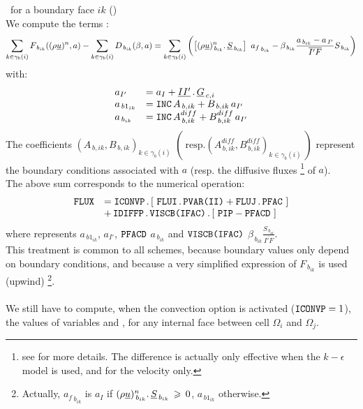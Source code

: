 \hspace*{1cm}{\tiny$\blacksquare$}\, for a boundary face $ik$ ()\\
We compute the terms :
\begin{equation}\notag
\sum_{k\in {\gamma_b(i)}} {F_{\,{b}_{ik}}((\rho \underline{u})^n,a)}
- \sum_{k\in {\gamma_b(i)}} {D_{\,{b}_{ik}}(\beta, a)}
=\sum_{k\in {\gamma_b(i)}}\displaystyle\left(\left[{(\rho
\underline{u})_{\,{b}_{ik}}^n} \text{.}\, \underline{S}_{\,{b}_{ik}}\right]\
{a_f}_{\,{b}_{ik}}- \beta_{\,b_{ik}}
\frac{a_{\,b_{ik}}-a_{\,I'}}{\overline{I'F}} S_{\,b_{ik}}\right)
\end{equation}
with:
\begin{equation}\notag
\begin{array}{lll}
a_{I'}& = a_I + \underline{II'}\,.\,\underline{G}_{\,c,i}\\
a_{\,{b1}_{ik}} &= \text{\texttt{INC}}\,A_{\,b,ik} + B_{\,b,ik}\,a_{I'}\\
a_{\,b_{ik}}& = \text{\texttt{INC}}\,A^{diff}_{\,b,ik} + B^{diff}_{\,b,ik}\,a_{I'}\\
\end{array}
\end{equation}
The coefficients $( A_{\,b,ik}, B_{\,b,ik} )_{k\in {\gamma_b(i)}}$ $\left(\ \text{resp.} ( A^{diff}_{\,b,ik}, B^{diff}_{\,b,ik} )_{k\in
{\gamma_b(i)}}\ \right)$ represent the boundary conditions associated with
$a$ (resp. the diffusive fluxes \footnote { see
 for more details. The difference is actually only effective when the $k-\epsilon$ model is used, and for the velocity only.} of $a$).\\
The above sum corresponds to the numerical operation:
\begin{equation}\label{Base_Bilsc2_eq_flux_bord}
\begin{array}{ll}
\text{\texttt{FLUX}}& = \text{\texttt{ICONVP}} \,.\,[\ \text{\texttt{FLUI}}\,.\, \text{\texttt{PVAR(II)}} + \text{\texttt{FLUJ}}\,.\, \text{\texttt{PFAC}}\ ]\\
&+\,\text{\texttt{IDIFFP}}\,.\,\text{\texttt{VISCB(IFAC)}}\,.\,[\ \text{\texttt{PIP}} - \text{\texttt{PFACD}}\ ]
\end{array}
\end{equation}
where  represents $a_{\,{b1}_{ik}}$,  $a_{I'}$, $\text{\texttt{PFACD}}$ $a_{\,b_{ik}}$ and $\text{\texttt{VISCB(IFAC)}}$
$ \beta_{\,b_{ik}} \displaystyle\frac{S_{\,b_{ik}}}{\overline{I'F}} $.\\
This treatment is common to all schemes, because boundary values only depend on boundary conditions, and because a very simplified expression of $F_{\,{b}_{ik}}$ is used (upwind)
\footnote{Actually, ${a_f}_{\,{b}_{ik}}$ is $a_I$ if  ${(\rho
\underline{u})_{\,{b}_{ik}}^n} \text{.}\, \underline{S}_{\,{b}_{ik}}\,\geqslant \,0$, $a_{\,{b1}_{ik}}$ otherwise.}.\\\\
We still have to compute, when the convection option is activated ($\text{\texttt{ICONVP}} = 1$),
the values of variables \var{PIF} and
, for any internal face  between cell
$\Omega_i$  and $\Omega_j$.
